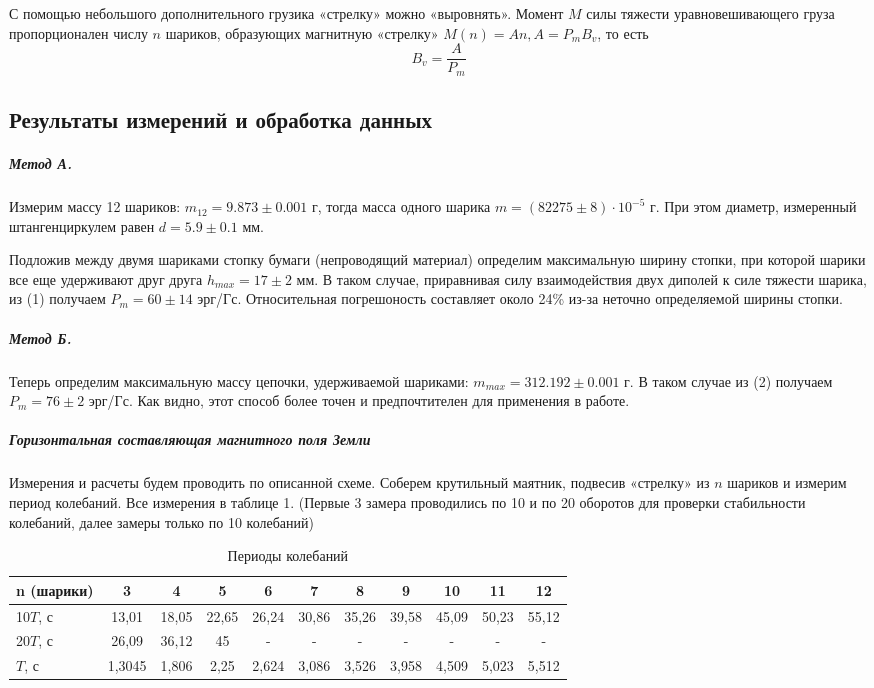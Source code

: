 \documentclass[12pt,a4paper]{article}
\begin{document}
С помощью небольшого дополнительного грузика «стрелку» можно «выровнять». 
Момент $M$ силы тяжести уравновешивающего груза пропорционален числу $n$ шариков, образующих магнитную «стрелку» $M(n) = An, A=P_m B_v$, то есть
\begin{equation}
    B_v = \dfrac{A}{P_m}
\end{equation}

\newpage 
\subsection*{Результаты измерений и обработка данных}
\subparagraph*{Метод А.} Измерим массу 12 шариков: $m_{12} = 9.873 \pm 0.001$ г, тогда масса одного шарика $m = (82275 \pm 8) \cdot 10^{-5}$ г.
При этом диаметр, измеренный штангенциркулем равен $d = 5.9 \pm 0.1$ мм.

Подложив между двумя шариками стопку бумаги (непроводящий материал) определим максимальную ширину стопки, при которой шарики все еще удерживают друг друга $h_{max} = 17 \pm 2$ мм.
В таком случае, приравнивая силу взаимодействия двух диполей к силе тяжести шарика, из (1) получаем $P_m = 60 \pm 14$ эрг/Гс. 
Относительная погрешоность составляет около 24\% из-за неточно определяемой ширины стопки.

\subparagraph*{Метод Б.} Теперь определим максимальную массу цепочки, удерживаемой шариками: $m_{max} = 312.192 \pm 0.001$ г. 
В таком случае из (2) получаем $P_m = 76 \pm 2 $ эрг/Гс. 
Как видно, этот способ более точен и предпочтителен для применения в работе.

\subparagraph*{Горизонтальная составляющая магнитного поля Земли}
Измерения и расчеты будем проводить по описанной схеме. 
Соберем крутильный маятник, подвесив «стрелку» из $n$ шариков и измерим период колебаний.
Все измерения в таблице 1. (Первые 3 замера проводились по 10 и по 20 оборотов для проверки стабильности колебаний, далее замеры только по 10 колебаний)

\begin{table}[H]
    \centering
    \begin{tabular}{|l|c|c|c|c|c|c|c|c|c|c|}
    \hline
    n (шарики)   & 3     & 4     & 5     & 6     & 7     & 8     & 9     & 10    & 11    & 12    \\ \hline
    10$T$, с     & 13,01 & 18,05 & 22,65 & 26,24 & 30,86 & 35,26 & 39,58 & 45,09 & 50,23 & 55,12 \\ \hline
    20$T$, с     & 26,09 & 36,12 & 45    &   -   &   -   &   -   &   -   &   -   &   -   &   -   \\ \hline
    $T$, с       & 1,3045& 1,806 & 2,25  & 2,624 & 3,086 & 3,526 & 3,958 & 4,509 & 5,023 & 5,512 \\ \hline
    \end{tabular}
    \caption{Периоды колебаний}
\end{table}
\end{document}
